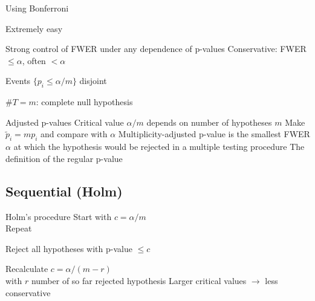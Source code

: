 \begin{frame}{Using Bonferroni}
    \bi
      \item Extremely easy
      \item Strong control of FWER under any dependence of p-values
    \ei
  \eb
    Conservative: FWER $\leq \alpha$, often $<\alpha$
  \eb
    \bi
      \item Events $\{p_i \leq \alpha/m\}$ disjoint
      \item $\# T = m$: complete null hypothesis
    \ei
  \eb
\end{frame}


\begin{frame}{Adjusted p-values}
    Critical value $\alpha/m$ depends on number of hypotheses $m$
  \eb
    Make $\tilde p_i = mp_i$ and compare with $\alpha$
  \eb
    Multiplicity-adjusted p-value is the smallest FWER $\alpha$ at which the hypothesis would be rejected in a multiple testing procedure
  \eb
    The definition of the regular p-value
  \eb
\end{frame}


\subsection{Sequential (Holm)}

\begin{frame}{Holm's procedure}
    Start with $c = \alpha/m$
    \\ Repeat
    \be
      \item Reject all hypotheses with p-value $\leq c$
      \item Recalculate $c = \alpha/(m-r)$ \\ with $r$ number of so far rejected hypothesis
    \ee
  \eb
    Larger critical values $\to$ less conservative
  \eb
\end{frame}


